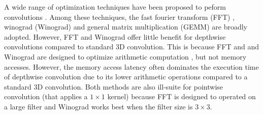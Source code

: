 A wide range of optimization techniques have been proposed to peform convolutions
\cite{li2016optimizing,Zhen2018Optimizing,enfedaque2014implementation,liu2019optimizing,winter2019adaptive,vasilache2014fast,lavin2016fast,Vasudevan2017Parallel,Chellapilla2006High}.
Among these techniques, the fast fourier transform (FFT) \cite{vasilache2014fast}, winograd (Winograd) \cite{lavin2016fast} and general
matrix multiplication (GEMM) \cite{Vasudevan2017Parallel,Chellapilla2006High} are broadly adopted. However, FFT and Winograd offer little
benefit for depthwise convolutions compared to standard 3D convolution. This is because FFT and and Winograd are designed to optimize
arithmetic computation \FIXME{\cite{}}, but not memory accesses. However, the memory access latency often dominates the execution time of
depthwise convolution \cite{cudaperformance} due to its lower arithmetic operations compared to a standard 3D convolution.  Both methods
are also ill-suite for pointwise convolution (that applies a $1 \times 1$ kernel) because FFT is designed to operated on a large filter and
Winograd works best when the filter size is $3 \times 3$.



